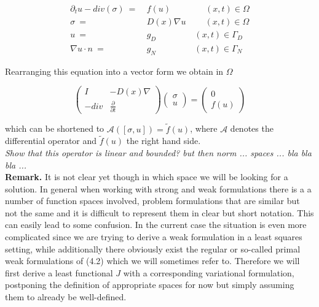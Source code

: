 \documentclass[../draft_1.tex]{subfiles}
\begin{document}
\begin{ceqn}
	\begin{equation}
	\begin{aligned}
	 \partial_t u - div(\sigma) \ =& \ f(u) \qquad \qquad (x,t) \in \Omega \\
	\sigma \ =& \ D(x)  \nabla u \ \qquad (x,t) \in \Omega  \\
	u \ =& \ g_D  \ \ \qquad  \qquad (x,t) \in \Gamma_D \\
	\nabla u \cdot n \ =& \ g_N  \ \ \qquad \qquad (x,t) \in \Gamma_N
	\end{aligned}
	\end{equation}
\end{ceqn}
Rearranging this equation into a vector form we obtain in $\Omega$
\begin{ceqn}
	\begin{equation}
	\begin{pmatrix}
	I & - D(x) \nabla \\
	- div & \frac{\partial}{\partial t} 
	\end{pmatrix}
	\begin{pmatrix}
	\sigma \\
	u
	\end{pmatrix} = 
	\begin{pmatrix}
	0 \\
	f(u)
	\end{pmatrix}
	\end{equation}
\end{ceqn}
which can be shortened to $\mathcal{A} ([\sigma, u]) = \tilde{f}(u)$, where $\mathcal{A}$ denotes the differential operator and $\tilde{f}(u)$ the right hand side. 
\smallskip
\\
\textit{Show that this operator is linear and bounded? but then norm ... spaces ... bla bla bla ...}
\smallskip
\\
\textbf{Remark.} It is not clear yet though in which space we will be looking for a solution. In general when working with strong and weak formulations there is a a number of function spaces involved, problem formulations that are similar but not the same and it is difficult to represent them in clear but short notation. This can easily lead to some confusion. In the current case the situation is even more complicated since we are trying to derive a weak formulation in a least squares setting, while additionally there obviously exist the regular or so-called primal weak formulations of (4.2) which we will sometimes refer to. Therefore we will first derive  a least functional $J$ with a corresponding variational formulation, postponing the definition of appropriate spaces for now but simply assuming them to already be well-defined. 
\end{document}
